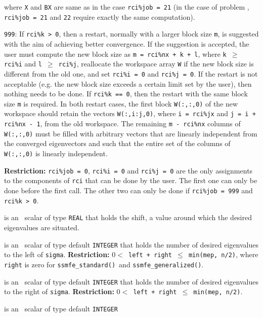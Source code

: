 \begin{description}
\begin{description}
where {\tt X} and {\tt BX} are same as in 
the case {\tt rci\%job = 21}
(in the case of problem ,
{\tt rci\%job = 21} and {\tt 22} 
require exactly the same computation).
%
\item
{\tt 999}: 
If {\tt rci\%k > 0}, then
a restart, normally with a larger block size {\tt m},
is suggested with the aim of achieving better convergence.
If the suggestion is accepted, the user must compute
the new block size as {\tt m = rci\%nx + k + l},
where {\tt k $\ge$ rci\%i} and {\tt l $\ge$ rci\%j},
reallocate the workspace array {\tt W}
if the new block size is different from the old one,
and set {\tt rci\%i = 0} and {\tt rci\%j = 0}.
If the restart is not acceptable
(e.g. the new block size exceeds a certain limit set by the user), 
then nothing needs to be done.
If {\tt rci\%k == 0}, then
the restart with the same block size {\tt m} is required.
In both restart cases,
the first block {\tt W(:,:,0)} of the new
workspace should retain the vectors 
{\tt W(:,i:j,0)},
where {\tt i = rci\%jx} and {\tt j = i + rci\%nx - 1},
from the old workspace.
The remaining {\tt m - rci\%nx} columns of {\tt W(:,:,0)}
must be filled
with arbitrary vectors that are linearly independent from 
the converged eigenvectors and such that
the entire set of the columns of {\tt W(:,:,0)}
is linearly independent.
%
\end{description}
%
{\bf Restriction:} 
{\tt rci\%job = 0}, 
{\tt rci\%i = 0} and
{\tt rci\%j = 0} 
are the only %
assignments to the components of {\tt rci}
that can be done
by the user.
The first one can only be done before the first call.
The other two can only be done if
{\tt rci\%job = 999} and {\tt rci\%k > 0}.
%
\item[\texttt{sigma}] 
is an \intentin\ scalar of type \texttt{REAL}
that holds the shift, 
a value around which the desired eigenvalues %
are situated.
%
\item[\texttt{left}] is an \intentin\ scalar of type default \texttt{INTEGER}
that holds the number of desired eigenvalues to the left of {\tt sigma}.
{\bf Restriction:} {\tt $0 < $ left + right $\le$ min(mep, n/2)},
where {\tt right} is zero for {\tt ssmfe\_standard()}\ and 
{\tt ssmfe\_generalized()}.
%
\item[\texttt{right}] 
is an \intentin\ scalar of type default \texttt{INTEGER}
that holds the number of desired eigenvalues to the right of {\tt sigma}.
{\bf Restriction:} {\tt $0 < $ left + right $\le$ min(mep, n/2)}.
%
\item[\texttt{mep}] is an \intentin\ scalar of type default \texttt{INTEGER}

\end{description}

